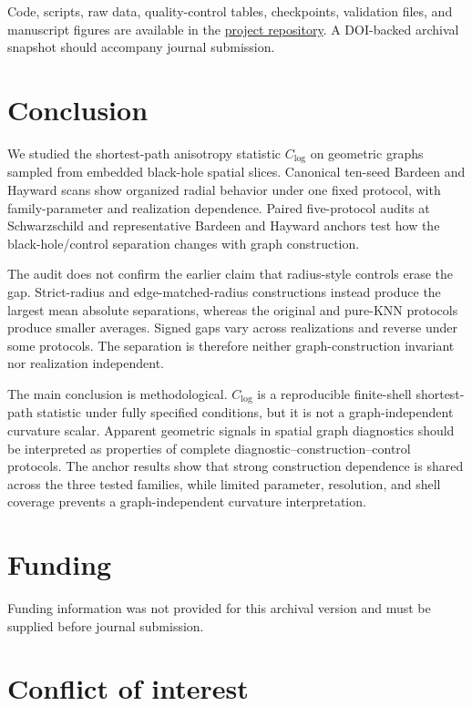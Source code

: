 \documentclass[11pt]{article}
\newcommand{\clog}{C_{\log}}
\begin{document}
Code, scripts, raw data, quality-control tables, checkpoints, validation files,
and manuscript figures are available in the \href{https://github.com/Uxuee/PathAnisotropyCurvature}{project repository}. A DOI-backed archival snapshot should accompany journal submission.

\section{Conclusion}

We studied the shortest-path anisotropy statistic $\clog$ on geometric graphs
sampled from embedded black-hole spatial slices. Canonical ten-seed Bardeen and
Hayward scans show organized radial behavior under one fixed protocol, with
family-parameter and realization dependence. Paired five-protocol audits at
Schwarzschild and representative Bardeen and Hayward anchors test how the
black-hole/control separation changes with graph construction.

The audit does not confirm the earlier claim that radius-style controls erase
the gap. Strict-radius and edge-matched-radius constructions instead produce the
largest mean absolute separations, whereas the original and pure-KNN protocols
produce smaller averages. Signed gaps vary across realizations and reverse under
some protocols. The separation is therefore neither graph-construction
invariant nor realization independent.

The main conclusion is methodological. $\clog$ is a reproducible finite-shell
shortest-path statistic under fully specified conditions, but it is not a
graph-independent curvature scalar. Apparent geometric signals in spatial graph
diagnostics should be interpreted as properties of complete
 diagnostic--construction--control protocols. The anchor results show that
strong construction dependence is shared across the three tested families,
while limited parameter, resolution, and shell coverage prevents a
graph-independent curvature interpretation.

\section*{Funding}

Funding information was not provided for this archival version and must be
supplied before journal submission.

\section*{Conflict of interest}
\end{document}
